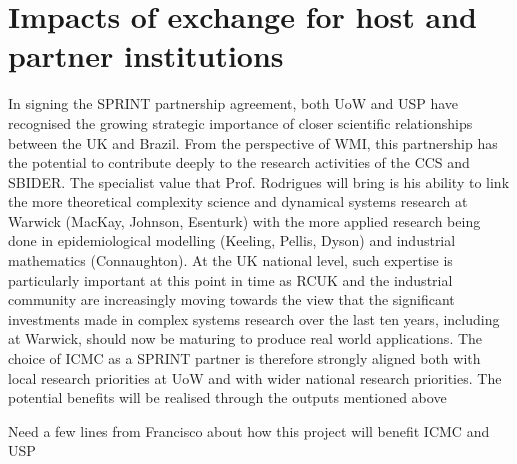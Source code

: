 \section{Impacts of exchange for host and partner institutions}
In signing the SPRINT partnership agreement, both UoW and USP have recognised 
the growing strategic importance of closer scientific relationships between the 
UK and Brazil.
From the perspective of WMI, this partnership has the potential to  contribute 
deeply to the research activities of the CCS and SBIDER. The specialist value 
that Prof. Rodrigues will bring is his ability to link the more theoretical 
complexity science and dynamical systems research at Warwick (MacKay, Johnson, 
Esenturk) with the more applied research being done in epidemiological 
modelling (Keeling, Pellis, Dyson) and industrial mathematics (Connaughton). At 
the UK national level, such expertise is particularly important at this point 
in time as RCUK and the industrial community are increasingly moving towards 
the view that the significant investments made in complex systems research over 
the last ten years, including at Warwick, should now be maturing to produce 
real world applications.  The choice of ICMC as a SPRINT partner is therefore 
strongly aligned both with local research priorities at UoW and with wider 
national research priorities. The potential benefits will be realised through 
the outputs mentioned above

{\color{red} Need a few lines from Francisco about how this project will 
benefit ICMC and USP}


